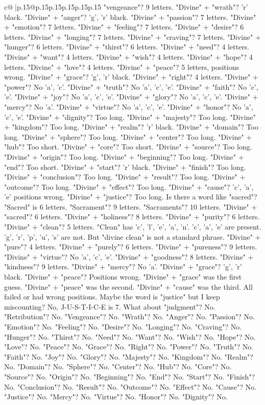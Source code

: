 \documentclass{article}
\begin{document}
{\begin{supertabular}{c@{$\;$}|p{.15\linewidth}@{}p{.15\linewidth}p{.15\linewidth}p{.15\linewidth}p{.15\linewidth}p{.15\linewidth}}
{{{"vengeance"? 9 letters. "Divine" + "wrath"? 'r' black. "Divine" + "anger"? 'g', 'r' black. "Divine" + "passion"? 7 letters. "Divine" + "emotion"? 7 letters. "Divine" + "feeling"? 7 letters. "Divine" + "desire"? 6 letters. "Divine" + "longing"? 7 letters. "Divine" + "craving"? 7 letters. "Divine" + "hunger"? 6 letters. "Divine" + "thirst"? 6 letters. "Divine" + "need"? 4 letters. "Divine" + "want"? 4 letters. "Divine" + "wish"? 4 letters. "Divine" + "hope"? 4 letters. "Divine" + "love"? 4 letters. "Divine" + "peace"? 5 letters, positions wrong. "Divine" + "grace"? 'g', 'r' black. "Divine" + "right"? 4 letters. "Divine" + "power"? No 'a', 'c'. "Divine" + "truth"? No 'a', 'c', 'e'. "Divine" + "faith"? No 'c', 'e'. "Divine" + "joy"? No 'a', 'c', 'e'. "Divine" + "glory"? No 'a', 'c', 'e'. "Divine" + "mercy"? No 'a'. "Divine" + "virtue"? No 'a', 'c', 'e'. "Divine" + "honor"? No 'a', 'c', 'e'. "Divine" + "dignity"? Too long. "Divine" + "majesty"? Too long. "Divine" + "kingdom"? Too long. "Divine" + "realm"? 'r' black. "Divine" + "domain"? Too long. "Divine" + "sphere"? Too long. "Divine" + "center"? Too long. "Divine" + "hub"? Too short. "Divine" + "core"? Too short. "Divine" + "source"? Too long. "Divine" + "origin"? Too long. "Divine" + "beginning"? Too long. "Divine" + "end"? Too short. "Divine" + "start"? 'r' black. "Divine" + "finish"? Too long. "Divine" + "conclusion"? Too long. "Divine" + "result"? Too long. "Divine" + "outcome"? Too long. "Divine" + "effect"? Too long. "Divine" + "cause"? 'c', 'a', 'e' positions wrong. "Divine" + "justice"? Too long. Is there a word like "sacred"? "Sacred" is 6 letters. "Sacrament"? 9 letters. "Sacraments"? 10 letters. "Divine" + "sacred"? 6 letters. "Divine" + "holiness"? 8 letters. "Divine" + "purity"? 6 letters. "Divine" + "clean"? 5 letters. "Clean" has 'c', 'l', 'e', 'a', 'n'. 'c', 'a', 'e' are present. 'g', 'r', 'p', 'u', 's' are not. But "divine clean" is not a standard phrase. "Divine" + "pure"? 4 letters. "Divine" + "purely"? 6 letters. "Divine" + "pureness"? 9 letters. "Divine" + "virtue"? No 'a', 'c', 'e'. "Divine" + "goodness"? 8 letters. "Divine" + "kindness"? 9 letters. "Divine" + "mercy"? No 'a'. "Divine" + "grace"? 'g', 'r' black. "Divine" + "peace"? Positions wrong. "Divine" + "grace" was the first guess. "Divine" + "peace" was the second. "Divine" + "cause" was the third. All failed or had wrong positions. Maybe the word is "justice" but I keep miscounting? No, J{-}U{-}S{-}T{-}I{-}C{-}E is 7. What about "judgment"? No. "Retribution"? No. "Vengeance"? No. "Wrath"? No. "Anger"? No. "Passion"? No. "Emotion"? No. "Feeling"? No. "Desire"? No. "Longing"? No. "Craving"? No. "Hunger"? No. "Thirst"? No. "Need"? No. "Want"? No. "Wish"? No. "Hope"? No. "Love"? No. "Peace"? No. "Grace"? No. "Right"? No. "Power"? No. "Truth"? No. "Faith"? No. "Joy"? No. "Glory"? No. "Majesty"? No. "Kingdom"? No. "Realm"? No. "Domain"? No. "Sphere"? No. "Center"? No. "Hub"? No. "Core"? No. "Source"? No. "Origin"? No. "Beginning"? No. "End"? No. "Start"? No. "Finish"? No. "Conclusion"? No. "Result"? No. "Outcome"? No. "Effect"? No. "Cause"? No. "Justice"? No. "Mercy"? No. "Virtue"? No. "Honor"? No. "Dignity"? No. }}}
\end{supertabular}}
\end{document}

